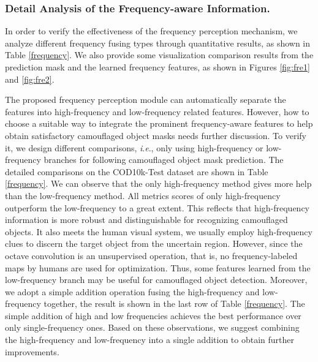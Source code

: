 \documentclass[sigconf,screen]{acmart}
\newcommand{\ie}{\textit{i}.\textit{e}.}
\begin{document}
\subsubsection{\textbf{Detail Analysis of the Frequency-aware Information.}}
In order to verify the effectiveness of the frequency perception mechanism, we analyze different frequency fusing types through quantitative results, as shown in Table \ref{frequency}.
We also provide some visualization comparison results from the prediction mask and the learned frequency features, as shown in Figures \ref{fig:fre1} and \ref{fig:fre2}.   



The proposed frequency perception module can automatically separate the features into high-frequency and low-frequency related features. However, how to choose a suitable way to integrate the prominent frequency-aware features to help obtain satisfactory camouflaged object masks needs further discussion. To verify it, we design different comparisons, \ie, only using high-frequency or low-frequency branches for following camouflaged object mask prediction. The detailed comparisons on the COD10k-Test dataset are shown in Table \ref{frequency}. We can observe that the only high-frequency method gives more help than the low-frequency method. All metrics scores of only high-frequency outperform the low-frequency to a great extent. This reflects that high-frequency information is more robust and distinguishable 
for recognizing camouflaged objects. It also meets the human visual system, we usually employ high-frequency clues to discern the target object from the uncertain region.  
However, since the octave convolution is an unsupervised operation, that is, no frequency-labeled maps by humans are used for optimization. Thus, some features learned from the low-frequency branch may be useful for camouflaged object detection. Moreover, we adopt a simple addition operation fusing the high-frequency and low-frequency together, the result is shown in the last row of Table \ref{frequency}. The simple addition of high and low frequencies achieves the best performance over only single-frequency ones. Based on these observations, we suggest combining the high-frequency and low-frequency into a single addition to obtain further improvements. 
\end{document}
